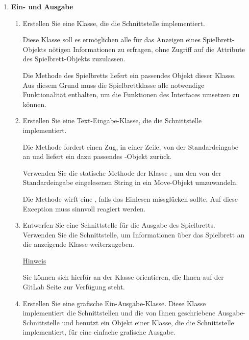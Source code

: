 \begin{enumerate}
\item \textbf{Ein- und Ausgabe}

\begin{enumerate}
\item Erstellen Sie eine Klasse, die die Schnittstelle  implementiert.

Diese Klasse soll es ermöglichen alle für das Anzeigen eines Spielbrett-Objekts nötigen Informationen zu erfragen, ohne Zugriff auf die Attribute des Spielbrett-Objekts zuzulassen.

Die Methode  des Spielbretts liefert ein passendes Objekt dieser Klasse. Aus diesem Grund muss die Spielbrettklasse alle notwendige Funktionalität enthalten, um die Funktionen des  Interfaces umsetzen zu können.

\item Erstellen Sie eine Text-Eingabe-Klasse, die die Schnittstelle \\  implementiert.

Die Methode  fordert einen Zug, in einer Zeile, von der Standardeingabe an und liefert ein dazu passendes -Objekt zurück.

Verwenden Sie die statische Methode  der Klasse , um den von der Standardeingabe eingelesenen String in ein Move-Objekt umzuwandeln.

Die Methode  wirft eine , falls das Einlesen missglücken sollte. Auf diese Exception muss sinnvoll reagiert werden.

\item Entwerfen Sie eine Schnittstelle für die Ausgabe des Spielbretts. Verwenden Sie die  Schnittstelle, um Informationen über das Spielbrett an die anzeigende Klasse weiterzugeben.

\underline{Hinweis}

Sie können sich hierfür an der Klasse  orientieren, die Ihnen auf der GitLab Seite zur Verfügung steht.

\item Erstellen Sie eine grafische Ein-Ausgabe-Klasse. Diese Klasse implementiert die Schnittstellen  und die von Ihnen geschriebene Ausgabe-Schnittstelle und benutzt ein Objekt einer Klasse, die die Schnittstelle  implementiert, für eine einfache grafische Ausgabe.


\end{enumerate}
\end{enumerate}
